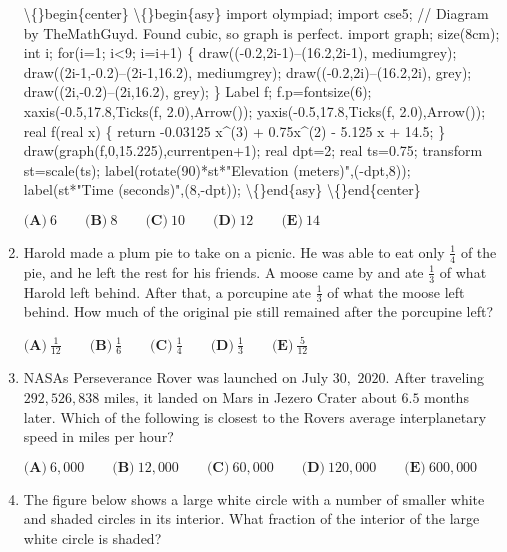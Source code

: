 \documentclass{article}
\begin{document}
\begin{enumerate}[label=\arabic*., itemsep=0.5em]
\textbackslash\{\}begin\{center\}
\textbackslash\{\}begin\{asy\}
import olympiad;
import cse5;
// Diagram by TheMathGuyd. Found cubic, so graph is perfect.
import graph;
size(8cm);
int i;
for(i=1; i<9; i=i+1)
\{
draw((-0.2,2i-1)--(16.2,2i-1), mediumgrey);
draw((2i-1,-0.2)--(2i-1,16.2), mediumgrey);
draw((-0.2,2i)--(16.2,2i), grey);
draw((2i,-0.2)--(2i,16.2), grey);
\}
Label f; 
f.p=fontsize(6); 
xaxis(-0.5,17.8,Ticks(f, 2.0),Arrow()); 
yaxis(-0.5,17.8,Ticks(f, 2.0),Arrow()); 
real f(real x) 
\{ 
return -0.03125 x\^{}(3) + 0.75x\^{}(2) - 5.125 x + 14.5; 
\} 
draw(graph(f,0,15.225),currentpen+1);
real dpt=2;
real ts=0.75;
transform st=scale(ts);
label(rotate(90)*st*"Elevation (meters)",(-dpt,8));
label(st*"Time (seconds)",(8,-dpt));
\textbackslash\{\}end\{asy\}
\textbackslash\{\}end\{center\}

\(\textbf{(A)}\ 6 \qquad \textbf{(B)}\ 8 \qquad \textbf{(C)}\ 10 \qquad \textbf{(D)}\ 12 \qquad \textbf{(E)}\ 14\)\par \vspace{0.5em}\item Harold made a plum pie to take on a picnic. He was able to eat only \(\frac{1}{4}\) of the pie, and he left the rest for his friends. A moose came by and ate \(\frac{1}{3}\) of what Harold left behind. After that, a porcupine ate \(\frac{1}{3}\) of what the moose left behind. How much of the original pie still remained after the porcupine left?

\(\textbf{(A)}\ \frac{1}{12} \qquad \textbf{(B)}\ \frac{1}{6} \qquad \textbf{(C)}\ \frac{1}{4} \qquad \textbf{(D)}\ \frac{1}{3} \qquad \textbf{(E)}\ \frac{5}{12}\)\par \vspace{0.5em}\item NASAs Perseverance Rover was launched on July \(30,\) \(2020.\) After traveling \(292{,}526{,}838\) miles, it landed on Mars in Jezero Crater about \(6.5\) months later. Which of the following is closest to the Rovers average interplanetary speed in miles per hour?

\(\textbf{(A)}\ 6{,}000 \qquad \textbf{(B)}\ 12{,}000 \qquad \textbf{(C)}\ 60{,}000 \qquad \textbf{(D)}\ 120{,}000 \qquad \textbf{(E)}\ 600{,}000\)\par \vspace{0.5em}\item The figure below shows a large white circle with a number of smaller white and shaded circles in its
interior. What fraction of the interior of the large white circle is shaded?



\end{enumerate}
\end{document}
